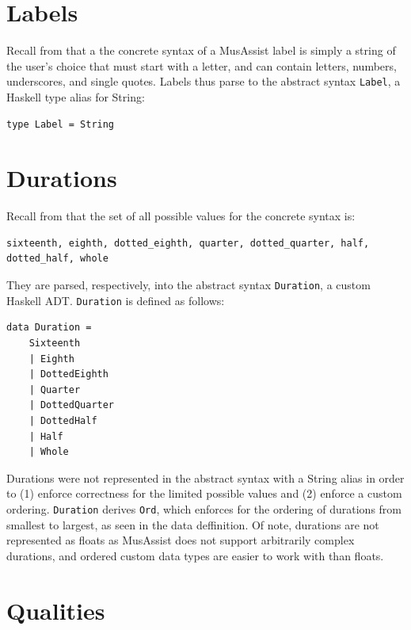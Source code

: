 \documentclass{report}
\newcommand\param[1]{\textttu{<#1>}}
\begin{document}
\section{Labels}
Recall from  that a the concrete syntax of a MusAssist label is simply a string of the user's choice that must start with a letter, and can contain letters, numbers, underscores, and single quotes. Labels thus parse to the abstract syntax \verb.Label., a Haskell type alias for String:

\begin{verbatim}
type Label = String
\end{verbatim}

\section{Durations}
Recall from  that the set of all possible values for the concrete syntax \param{DURATION} is:

\begin{verbatim}
sixteenth, eighth, dotted_eighth, quarter, dotted_quarter, half, dotted_half, whole
\end{verbatim}

They are parsed, respectively, into the abstract syntax \verb.Duration., a custom Haskell ADT. \verb.Duration. is defined as follows:

\begin{verbatim}
data Duration = 
    Sixteenth
    | Eighth 
    | DottedEighth 
    | Quarter 
    | DottedQuarter 
    | DottedHalf 
    | Half 
    | Whole 
\end{verbatim}

Durations were not represented in the abstract syntax with a String alias in order to (1) enforce correctness for the limited possible values and (2) enforce a custom ordering. \verb.Duration. derives \verb.Ord., which enforces for the ordering of durations from smallest to largest, as seen in the data deffinition. Of note, durations are not represented as floats as MusAssist does not support arbitrarily complex durations, and ordered custom data types are easier to work with than floats.

\section{Qualities}
\end{document}
